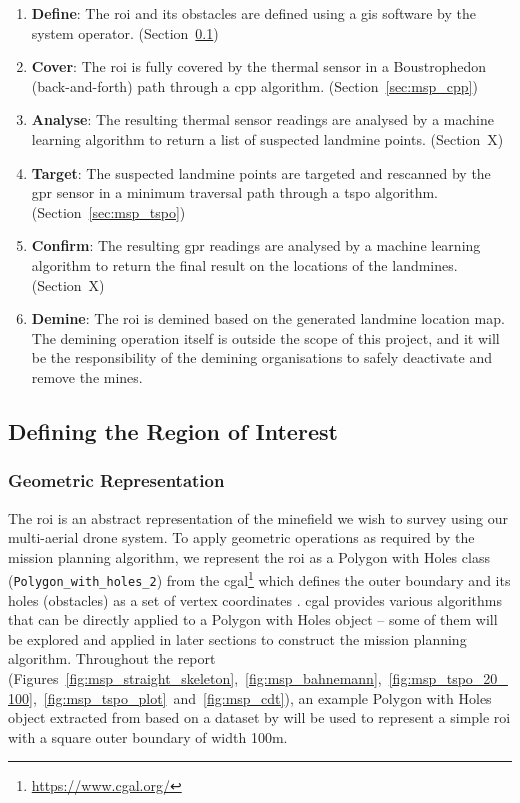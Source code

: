 \begin{enumerate}
    \item \textbf{Define}: The \gls{roi} and its obstacles are defined using a \gls{gis} software by the system operator. (Section~\ref{sec:msp_define})
    \item \textbf{Cover}: The \gls{roi} is fully covered by the thermal sensor in a Boustrophedon (back-and-forth) path through a \gls{cpp} algorithm. (Section~\ref{sec:msp_cpp})
    \item \textbf{Analyse}: The resulting thermal sensor readings are analysed by a machine learning algorithm to return a list of suspected landmine points. (Section~X) 
    \item \textbf{Target}: The suspected landmine points are targeted and rescanned by the \gls{gpr} sensor in a minimum traversal path through a \gls{tspo} algorithm. (Section~\ref{sec:msp_tspo}) 
    \item \textbf{Confirm}: The resulting \gls{gpr} readings are analysed by a machine learning algorithm to return the final result on the locations of the landmines. (Section~X)
    \item \textbf{Demine}: The \gls{roi} is demined based on the generated landmine location map. The demining operation itself is outside the scope of this project, and it will be the responsibility of the demining organisations to safely deactivate and remove the mines.
\end{enumerate}


\subsection{Defining the Region of Interest}
\label{sec:msp_define}

\subsubsection{Geometric Representation}

The \gls{roi} is an abstract representation of the minefield we wish to survey using our multi-aerial drone system. To apply geometric operations as required by the mission planning algorithm, we represent the \gls{roi} as a Polygon with Holes class (\texttt{Polygon\_with\_holes\_2}) from the \gls{cgal}\footnote{\url{https://www.cgal.org/}} which defines the outer boundary and its holes (obstacles) as a set of vertex coordinates \cite{cgal2024pwh}. \gls{cgal} provides various algorithms that can be directly applied to a Polygon with Holes object -- some of them will be explored and applied in later sections to construct the mission planning algorithm. Throughout the report (Figures~\ref{fig:msp_straight_skeleton},~\ref{fig:msp_bahnemann},~\ref{fig:msp_tspo_20_100},~\ref{fig:msp_tspo_plot}~and~\ref{fig:msp_cdt}), an example Polygon with Holes object extracted from \cite{bahnemann2021cpp} based on a dataset by \cite{sun2014dataset} will be used to represent a simple \gls{roi} with a square outer boundary of width 100m. 

